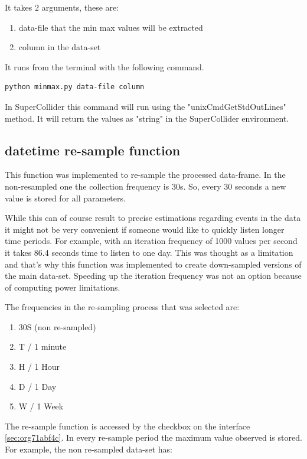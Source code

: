 \documentclass[11pt]{article}
\begin{document}
It takes 2 arguments, these are:
\begin{enumerate}
\item data-file that the min max values will be extracted
\item column in the data-set
\end{enumerate}

It runs from the terminal with the following command.
\begin{verbatim}
python minmax.py data-file column
\end{verbatim}

In SuperCollider this command will run using the "unixCmdGetStdOutLines" method.  It will return the values as "string" in the SuperCollider environment.

\subsection{datetime re-sample function}
\label{sec:orgc36ea85}

This function was implemented to re-sample the processed data-frame.  In the non-resampled one the collection frequency is 30s. So, every 30 seconds a new value is stored for all parameters.

While this can of course result to precise estimations regarding events in the data it might not be very convenient if someone would like to quickly listen longer time periods.  For example, with an iteration frequency of 1000 values per second it takes 86.4 seconds time to listen to one day.  This was thought as a limitation and that's why this function was implemented to create down-sampled versions of the main data-set.  Speeding up the iteration frequency was not an option because of computing power limitations.

The frequencies in the re-sampling process that was selected are:
\begin{enumerate}
\item 30S (non re-sampled)
\item T / 1 minute
\item H / 1 Hour
\item D / 1 Day
\item W / 1 Week
\end{enumerate}

The re-sample function is accessed by the checkbox on the interface \ref{sec:org71abf4c}.  In every re-sample period the maximum value observed is stored.  For example, the non re-sampled data-set has:
\end{document}
